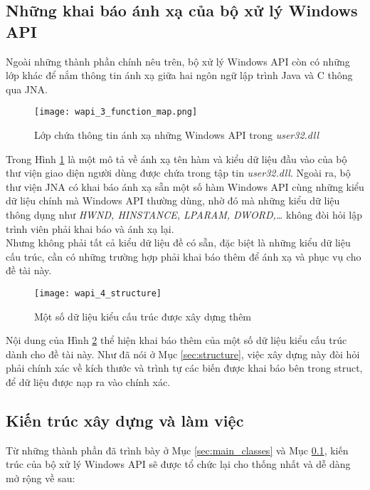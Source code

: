 	\newpage
	\subsection{Những khai báo ánh xạ của bộ xử lý Windows API} \label{sec:mapping}

Ngoài những thành phần chính nêu trên, bộ xử lý Windows API còn có những lớp khác để nắm thông tin ánh xạ giữa hai ngôn ngữ lập trình Java và C thông qua JNA.

	\begin{figure}[H]
	\centering
		\texttt{[image: wapi\_3\_function\_map.png]}
		\caption{Lớp chứa thông tin ánh xạ những Windows API trong \textit{user32.dll}}	
		\label{fig:wapi_3_function_map}		
	\end{figure}

Trong Hình \ref{fig:wapi_3_function_map} là một mô tả về ánh xạ tên hàm và kiểu dữ liệu đầu vào của bộ thư viện giao diện người dùng được chứa trong tập tin \textit{user32.dll}. Ngoài ra, bộ thư viện JNA có khai báo ánh xạ sẵn một số hàm Windows API cùng những kiểu dữ liệu chính mà Windows API thường dùng, nhờ đó mà những kiểu dữ liệu thông dụng như \textit{HWND, HINSTANCE, LPARAM, DWORD,…} không đòi hỏi lập trình viên phải khai báo và ánh xạ lại.\\

Nhưng không phải tất cả kiểu dữ liệu đề có sẵn, đặc biệt là những kiểu dữ liệu cấu trúc, cần có những trường hợp phải khai báo thêm để ánh xạ và phục vụ cho đề tài này.

	\begin{figure}[H]
	\centering
		\texttt{[image: wapi\_4\_structure]}
		\caption{Một số dữ liệu kiểu cấu trúc được xây dựng thêm}	
		\label{fig:wapi_4_structure}		
	\end{figure}

Nội dung của Hình \ref{fig:wapi_4_structure} thể hiện khai báo thêm của một số dữ liệu kiểu cấu trúc dành cho đề tài này. Như đã nói ở Mục \ref{sec:structure}, việc xây dựng này đòi hỏi phải chính xác về kích thước và trình tự các biến được khai báo bên trong struct, để dữ liệu được nạp ra vào chính xác.

	\subsection{Kiến trúc xây dựng và làm việc}

Từ những thành phần đã trình bày ở Mục \ref{sec:main_classes} và Mục \ref{sec:mapping}, kiến trúc của bộ xử lý Windows API sẽ được tổ chức lại cho thống nhất và dễ dàng mở rộng về sau:

